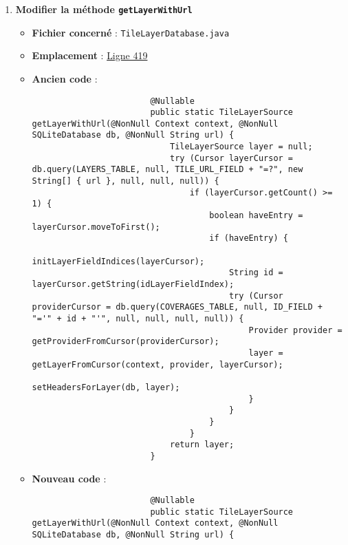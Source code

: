 \begin{enumerate}
\begin{itemize}
\begin{verbatim}
                    \end{verbatim}
          \end{itemize}

    \item \textbf{Modifier la méthode \texttt{getLayerWithUrl}}
          \begin{itemize}
              \item \textbf{Fichier concerné} : \texttt{TileLayerDatabase.java}
              \item \textbf{Emplacement} :
                    \href{https://github.com/MarcusWolschon/osmeditor4android/blob/master/src/main/java/de/blau/android/resources/TileLayerDatabase.java#L419 }{Ligne 419}
              \item \textbf{Ancien code} :
                    \begin{verbatim}
                        @Nullable
                        public static TileLayerSource getLayerWithUrl(@NonNull Context context, @NonNull SQLiteDatabase db, @NonNull String url) {
                            TileLayerSource layer = null;
                            try (Cursor layerCursor = db.query(LAYERS_TABLE, null, TILE_URL_FIELD + "=?", new String[] { url }, null, null, null)) {
                                if (layerCursor.getCount() >= 1) {
                                    boolean haveEntry = layerCursor.moveToFirst();
                                    if (haveEntry) {
                                        initLayerFieldIndices(layerCursor);
                                        String id = layerCursor.getString(idLayerFieldIndex);
                                        try (Cursor providerCursor = db.query(COVERAGES_TABLE, null, ID_FIELD + "='" + id + "'", null, null, null, null)) {
                                            Provider provider = getProviderFromCursor(providerCursor);
                                            layer = getLayerFromCursor(context, provider, layerCursor);
                                            setHeadersForLayer(db, layer);
                                            }
                                        }
                                    }
                                }
                            return layer;
                        }
\end{verbatim}
              \item \textbf{Nouveau code} :
                    \begin{verbatim}
                        @Nullable
                        public static TileLayerSource getLayerWithUrl(@NonNull Context context, @NonNull SQLiteDatabase db, @NonNull String url) {

\end{verbatim}
\end{itemize}
\end{enumerate}
